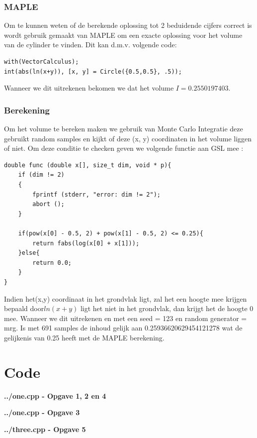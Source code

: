 \documentclass[10pt,a4paper]{article}
\begin{document}
\subsubsection{MAPLE}
Om te kunnen weten of de berekende oplossing tot 2 beduidende cijfers correct is wordt gebruik gemaakt van MAPLE om een exacte oplossing voor het volume van de cylinder te vinden. Dit kan d.m.v. volgende code:
\begin{lstlisting}
with(VectorCalculus);
int(abs(ln(x+y)), [x, y] = Circle({0.5,0.5}, .5));
\end{lstlisting}
Wanneer we dit uitrekenen bekomen we dat het volume $I = 0.2550197403$.
\subsubsection{Berekening}
Om het volume te bereken maken we gebruik van Monte Carlo Integratie deze gebruikt random samples en kijkt of deze (x, y) coordinaten in het volume liggen of niet. Om deze conditie te checken geven we volgende functie aan GSL mee :
\begin{lstlisting}
double func (double x[], size_t dim, void * p){
    if (dim != 2)
    {
        fprintf (stderr, "error: dim != 2");
        abort ();
    }

    if(pow(x[0] - 0.5, 2) + pow(x[1] - 0.5, 2) <= 0.25){
        return fabs(log(x[0] + x[1]));
    }else{
        return 0.0;
    }
}
\end{lstlisting}
Indien het(x,y) coordinaat in het grondvlak ligt, zal het een hoogte mee krijgen bepaald door$ln(x+y)$ ligt het niet in het grondvlak, dan krijgt het de hoogte 0 mee. Wanneer we dit uitrekenen en met een seed = 123 en random generator = mrg. Is met 691 samples de inhoud gelijk aan 0.25936620629454121278 wat de gelijkenis van 0.25 heeft met de MAPLE berekening.
\section{Code}
\textbf{../one.cpp - Opgave 1, 2 en 4}


\textbf{../one.cpp - Opgave 3}


\textbf{../three.cpp - Opgave 5}

\end{document}
